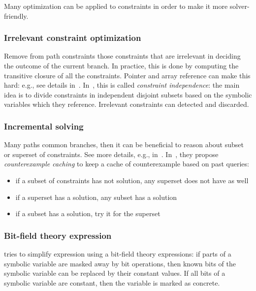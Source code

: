 
Many optimization can be applied to constraints in order to make it more solver-friendly.

\subsubsection{Irrelevant constraint optimization} Remove from path constraints those constraints that are irrelevant in deciding the outcome of the current branch. In practice, this is done by computing the transitive closure of all the constraints. Pointer and array reference can make this hard: e.g., see details in~\cite{EXE-CCS06,EGL-ISSTA09,CUTE-FSE13}. In~\cite{KLEE-OSDI08}, this is called {\em constraint independence}: the main idea is to divide constraints in independent disjoint subsets based on the symbolic variables which they reference. Irrelevant constraints can detected and discarded.

\subsubsection{Incremental solving} Many paths common branches, then it can be beneficial to reason about subset or superset of constraints. See more details, e.g., in~\cite{KLEE-OSDI08,CUTE-FSE13}. In~\cite{KLEE-OSDI08}, they propose {\em counterexample caching} to keep a cache of counterexample based on past queries:
      \begin{itemize}
        \item if a subset of constraints has not solution, any superset does not have as well
        \item if a superset has a solution, any subset has a solution
        \item if a subset has a solution, try it for the superset
      \end{itemize}

\subsubsection{Bit-field theory expression} \cite{CKC-TOCS12} tries to simplify expression using a bit-field theory expressions: if parts of a symbolic variable are masked away by bit operations, then known bits of the symbolic variable can be replaced by their constant values. If all bits of a symbolic variable are constant, then the variable is marked as concrete.

